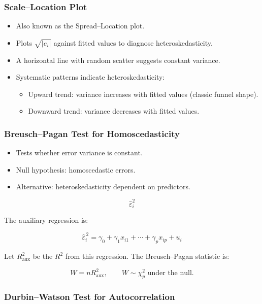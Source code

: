 \documentclass[11pt,a4paper]{article}
\begin{document}
\subsubsection{Scale--Location Plot}

\begin{itemize}
    \item Also known as the Spread--Location plot.
    \item Plots $\sqrt{|e_i|}$ against fitted values to diagnose heteroskedasticity.
    \item A horizontal line with random scatter suggests constant variance.
    \item Systematic patterns indicate heteroskedasticity:
    \begin{itemize}
        \item Upward trend: variance increases with fitted values (classic funnel shape).
        \item Downward trend: variance decreases with fitted values.
    \end{itemize}
\end{itemize}

\subsubsection{Breusch--Pagan Test for Homoscedasticity}

\begin{itemize}
    \item Tests whether error variance is constant.
    \item Null hypothesis: homoscedastic errors.
    \item Alternative: heteroskedasticity dependent on predictors.
\end{itemize}

\[
\hat{\varepsilon}_i^2
\]

The auxiliary regression is:

\[
\hat{\varepsilon}_i^{\,2} = \gamma_0 + \gamma_1 x_{i1} + \cdots + \gamma_p x_{ip} + u_i
\]

Let $R_{\text{aux}}^{2}$ be the $R^2$ from this regression.  
The Breusch--Pagan statistic is:

\[
W = n R_{\text{aux}}^{2},
\qquad W \sim \chi^2_{p} \text{ under the null}.
\]

\subsubsection{Durbin--Watson Test for Autocorrelation}
\end{document}
